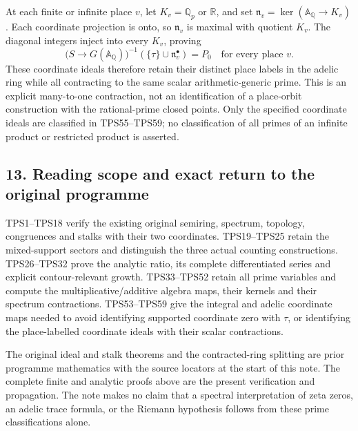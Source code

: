 \documentclass[
  10pt,
]{article}
\begin{document}
At each finite or infinite place \(v\), let \(K_v=\mathbb Q_p\) or
\(\mathbb R\), and set
\(\mathfrak n_v=\ker(\mathbb A_{\mathbb Q}\to K_v)\). Each coordinate
projection is onto, so \(\mathfrak n_v\) is maximal with quotient
\(K_v\). The diagonal integers inject into every \(K_v\), proving \[
\boxed{\bigl(S\to G(\mathbb A_{\mathbb Q})\bigr)^{-1}
(\{\tau\}\cup\mathfrak n_v^\bullet)=P_0\quad\text{for every place }v.}
\tag{TPS59}
\] These coordinate ideals therefore retain their distinct place labels
in the adelic ring while all contracting to the same scalar
arithmetic-generic prime. This is an explicit many-to-one contraction,
not an identification of a place-orbit construction with the
rational-prime closed points. Only the specified coordinate ideals are
classified in TPS55--TPS59; no classification of all primes of an
infinite product or restricted product is asserted.

\subsection{13. Reading scope and exact return to the original
programme}\label{reading-scope-and-exact-return-to-the-original-programme}

TPS1--TPS18 verify the existing original semiring, spectrum, topology,
congruences and stalks with their two coordinates. TPS19--TPS25 retain
the mixed-support sectors and distinguish the three actual counting
constructions. TPS26--TPS32 prove the analytic ratio, its complete
differentiated series and explicit contour-relevant growth. TPS33--TPS52
retain all prime variables and compute the multiplicative/additive
algebra maps, their kernels and their spectrum contractions.
TPS53--TPS59 give the integral and adelic coordinate maps needed to
avoid identifying supported coordinate zero with \(\tau\), or
identifying the place-labelled coordinate ideals with their scalar
contractions.

The original ideal and stalk theorems and the contracted-ring splitting
are prior programme mathematics with the source locators at the start of
this note. The complete finite and analytic proofs above are the present
verification and propagation. The note makes no claim that a spectral
interpretation of zeta zeros, an adelic trace formula, or the Riemann
hypothesis follows from these prime classifications alone.
\end{document}
